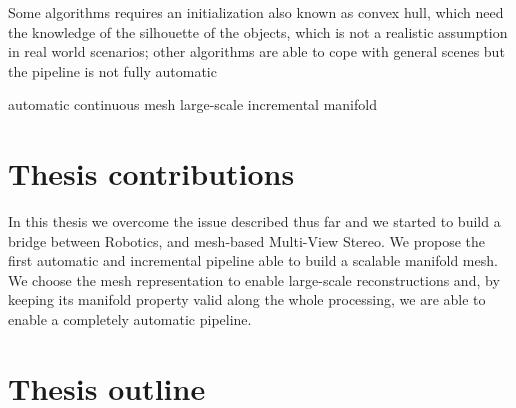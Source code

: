 Some algorithms requires an initialization also known as convex hull, which need the knowledge of the silhouette of the objects, which  is not a realistic assumption in real world scenarios; other algorithms are able to cope with general scenes but the pipeline is not fully automatic






automatic
continuous mesh
large-scale
incremental
manifold





\section{Thesis contributions}
In this thesis we overcome the issue described thus far and we started to build a bridge between Robotics, and mesh-based Multi-View Stereo.
We propose the first automatic and incremental pipeline able to build a scalable manifold mesh.
We choose the mesh representation to enable large-scale reconstructions and, by keeping its manifold property valid along the whole processing, we are able to enable a completely automatic pipeline.





\section{Thesis outline}










